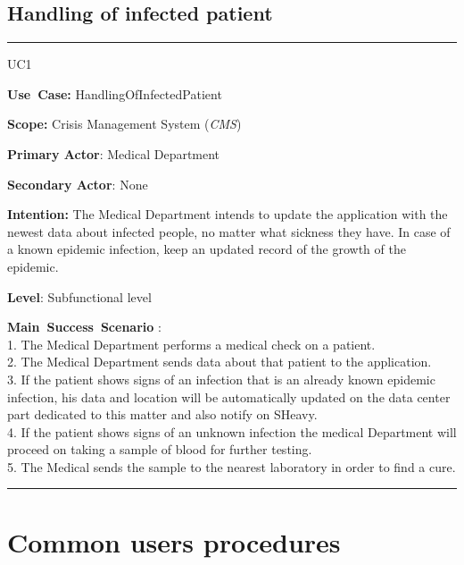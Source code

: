 \subsection{Handling of infected patient}
\vspace{0.5cm}
\hrule
\vspace{0.5cm}
\begin{lyxlist}{UC1}
\small{
\item [\textbf{Use~Case:}] HandlingOfInfectedPatient
\item [\textbf{Scope:}] Crisis Management System (\emph{CMS})
\item [\textbf{Primary Actor}:] Medical Department
\item [\textbf{Secondary Actor}:] None
\item [\textbf{Intention:}]The Medical Department intends to update
the application with the newest data about infected people, no matter what
sickness they have. In case of a known epidemic infection, keep an updated
record of the growth of the epidemic.
\item [\textbf{Level}:]Subfunctional level
\item [\textbf{Main~Success~Scenario}]:\\
1. The Medical Department performs a medical check on a patient.\\
2. The Medical Department sends data about that patient to the application.\\
3. If the patient shows signs of an infection that is an already known epidemic infection, his data
and location will be automatically updated on the data center part dedicated to
this matter and also notify on SHeavy.\\
4. If the patient shows signs of an unknown infection the medical Department
will proceed on taking a sample of blood for further testing.\\
5. The Medical sends the sample to the nearest laboratory in order to find a
cure.\\
}
\end{lyxlist}
\hrule
\vspace{0.5cm} 

\section{Common users procedures}

